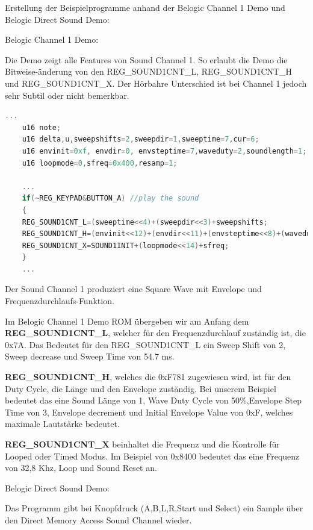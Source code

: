 \documentclass[11pt,a4paper]{scrartcl}
\begin{document}
Erstellung der Beispielprogramme anhand der Belogic Channel 1 Demo und Belogic Direct Sound Demo:

Belogic Channel 1 Demo:

Die Demo zeigt alle Features von Sound Channel 1. So erlaubt die Demo die Bitweise-\"anderung von den REG\_SOUND1CNT\_L, REG\_SOUND1CNT\_H und REG\_SOUND1CNT\_X. Der H\"orbahre Unterschied ist bei Channel 1 jedoch sehr Subtil oder nicht bemerkbar.


\vspace{5mm}
\begin{lstlisting}[language=C++, caption={Belogic Channel 1 Demo}, label={list:channel1}]
	...
	u16 note;
	u16 delta,u,sweepshifts=2,sweepdir=1,sweeptime=7,cur=6;
	u16 envinit=0xf, envdir=0, envsteptime=7,waveduty=2,soundlength=1;
	u16 loopmode=0,sfreq=0x400,resamp=1;

    ...
	if(~REG_KEYPAD&BUTTON_A) //play the sound
	{ 
	REG_SOUND1CNT_L=(sweeptime<<4)+(sweepdir<<3)+sweepshifts;
	REG_SOUND1CNT_H=(envinit<<12)+(envdir<<11)+(envsteptime<<8)+(waveduty<<6)+soundlength;
	REG_SOUND1CNT_X=SOUND1INIT+(loopmode<<14)+sfreq;
	}
	...
\end{lstlisting}

Der Sound Channel 1 produziert eine Square Wave mit Envelope und Frequenzdurchlaufs-Funktion. 

Im Belogic Channel 1 Demo ROM \"ubergeben wir am Anfang dem \textbf{REG\_SOUND1CNT\_L}, welcher f\"ur den Frequenzdurchlauf zust\"andig ist, die 0x7A. Das Bedeutet f\"ur den REG\_SOUND1CNT\_L ein Sweep Shift von 2, Sweep decrease und Sweep Time von 54.7 ms.


\textbf{REG\_SOUND1CNT\_H}, welches die 0xF781 zugewiesen wird, ist f\"ur den Duty Cycle, die L\"ange und den Envelope zust\"andig. Bei unserem Beispiel bedeutet das eine Sound L\"ange von 1, Wave Duty Cycle von 50\%,Envelope Step Time von 3, Envelope decrement und Initial Envelope Value von 0xF, welches maximale Lautst\"arke bedeutet.

\textbf{REG\_SOUND1CNT\_X} beinhaltet die Frequenz und die Kontrolle f\"ur Looped oder Timed Modus. Im Beispiel von 0x8400 bedeutet das eine Frequenz von 32,8 Khz, Loop und Sound Reset an. 

\newpage

Belogic Direct Sound Demo:

Das Programm gibt bei Knopfdruck (A,B,L,R,Start und Select) ein Sample \"uber den Direct Memory Access Sound Channel wieder.
\end{document}
